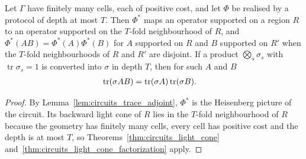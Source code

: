 \begin{theorem}
    \label{thm:protocols_light_cone}
    \leanok
    Let $\Gamma$ have finitely many cells, each of positive cost, and let $\Phi$ be realised
    by a protocol of depth at most $T$. Then $\Phi^*$ maps an operator supported on a region
    $R$ to an operator supported on the $T$-fold neighbourhood of $R$, and
    $\Phi^*(AB)=\Phi^*(A)\Phi^*(B)$ for $A$ supported on $R$ and $B$ supported on $R'$ when
    the $T$-fold neighbourhoods of $R$ and $R'$ are disjoint. If a product $\bigotimes_s\sigma_s$ with
    $\operatorname{tr}\sigma_s=1$ is converted into $\sigma$ in depth $T$, then for such $A$
    and $B$
    \begin{align}
        \operatorname{tr}(\sigma AB)&=\operatorname{tr}(\sigma A)\operatorname{tr}(\sigma B).
        \notag
    \end{align}
\end{theorem}
\begin{proof}\leanok
    By Lemma~\ref{lem:circuits_trace_adjoint}, $\Phi^*$ is the Heisenberg picture of the
    circuit. Its backward light cone of $R$ lies in the $T$-fold neighbourhood of $R$ because
    the geometry has finitely many cells, every cell has positive cost and the depth is at most
    $T$, so Theorems~\ref{thm:circuits_light_cone}
    and~\ref{thm:circuits_light_cone_factorization} apply.
\end{proof}

